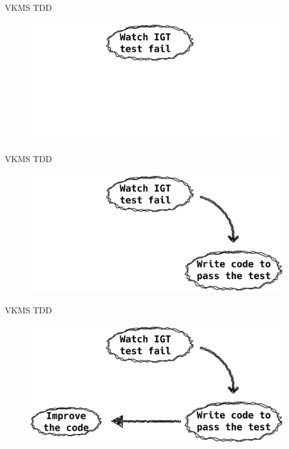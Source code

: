 \documentclass[10pt, compress, aspectratio=169]{beamer}
\begin{document}
\begin{frame}{VKMS TDD}
  \begin{figure}
    \centering
    \includegraphics[width=\linewidth,
                     height=0.8\textheight,
                     keepaspectratio]{tdd-drm_1}
  \end{figure}
\end{frame}

\begin{frame}{VKMS TDD}
  \begin{figure}
    \centering
    \includegraphics[width=\linewidth,
                     height=0.8\textheight,
                     keepaspectratio]{tdd-drm_2}
  \end{figure}
\end{frame}

\begin{frame}{VKMS TDD}
  \begin{figure}
    \centering
    \includegraphics[width=\linewidth,
                     height=0.8\textheight,
                     keepaspectratio]{tdd-drm_3}
  \end{figure}
\end{frame}
\end{document}
